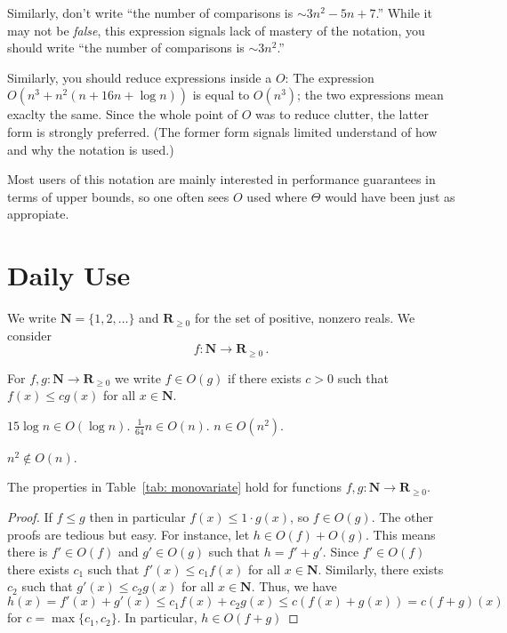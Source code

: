 \documentclass{tstextbook}
\begin{document}
Similarly, don’t write ``the number of comparisons is $\sim 3n^2  - 5n +7$.''
While it may not be \emph{false}, this expression signals lack of mastery of the notation, you should write
``the number of comparisons is $\sim 3n^2$.''

Similarly, you should reduce expressions inside a $O$:
The expression $O(n^3 + n^2(n + 16n + \log n))$ is equal to $O(n^3)$;
the two expressions mean exaclty the same.
Since the whole point of $O$ was to reduce clutter, the latter form is strongly preferred.
(The former form signals limited understand of how and why the notation is used.)

Most users of this notation are mainly interested in performance guarantees in terms of upper bounds, so one often sees $O$ used where $\Theta$ would have been just as appropiate.

\chapter{Daily Use}

We write $\mathbf N=\{1,2,\ldots\}$ and $\mathbf R_{\geq 0}$ for the set of positive, nonzero reals.
We consider
\[ f\colon\mathbf N\rightarrow \mathbf R_{\geq 0}\,.\]

\begin{definition}
  For $f,g\colon \mathbf N\rightarrow \mathbf R_{\geq 0}$ we write
  $f\in O(g)$ if there exists $c>0$ such that $f(x) \leq cg(x)$ for all $x\in\mathbf N$.
\end{definition}

\begin{example}
  $15\log n \in O(\log n)$.
  $\frac{1}{64} n \in O(n)$.
  $n \in O(n^2)$.
\end{example}

\begin{example}[Counterexample.]
  $n^2 \notin O(n)$.
\end{example}

\begin{theorem}
  The properties in Table~\ref{tab: monovariate} hold for
  functions $f,g\colon \mathbf N\rightarrow \mathbf R_{\geq 0}$.
\end{theorem}

\begin{proof}
  If $f\leq g$ then in particular $f(x)\leq 1\cdot g(x)$, so $f\in O(g)$.
  The other proofs are tedious but easy.
  For instance, let $h\in O(f) + O(g)$.
  This means there is $f'\in O(f)$ and $g'\in O(g)$ such that $h=f'+g'$.
  Since $f'\in O(f)$ there exists $c_1$ such that $f'(x)\leq c_1 f(x)$ for all $x\in \mathbf N$.
  Similarly,  there exists $c_2$ such that $g'(x)\leq c_2g(x)$ for all $x\in \mathbf N$.
  Thus, we have $h(x) = f'(x) + g'(x) \leq c_1f(x) + c_2 g(x) \leq c(f(x) + g(x)) = c(f+g)(x)$ for $c=\max\{c_1,c_2\}$.
  In particular, $h\in O(f + g)$
\end{proof}
\end{document}
